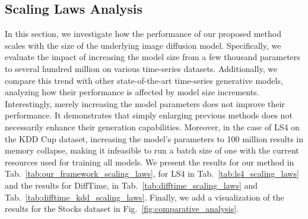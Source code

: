 \documentclass{article}
\begin{document}
\subsection{Scaling Laws Analysis}
In this section, we investigate how the performance of our proposed method scales with the size of the underlying image diffusion model. Specifically, we evaluate the impact of increasing the model size from a few thousand parameters to several hundred million on various time-series datasets. Additionally, we compare this trend with other state-of-the-art time-series generative models, analyzing how their performance is affected by model size increments. Interestingly, merely increasing the model parameters does not improve their performance. It demonstrates that simply enlarging previous methods does not necessarily enhance their generation capabilities. Moreover, in the case of LS4 on the KDD Cup dataset, increasing the model's parameters to 100 million results in memory collapse, making it infeasible to run a batch size of one with the current resources used for training all models. We present the results for our method in Tab.~\ref{tab:our_framework_scaling_laws}, for LS4 in Tab.~\ref{tab:ls4_scaling_laws} and the results for DiffTime, in Tab.~\ref{tab:difftime_scaling_laws} and Tab.~\ref{tab:difftime_kdd_scaling_laws}. Finally, we add a visualization of the results for the Stocks dataset in Fig.~\ref{fig:comparative_analysis}.

\clearpage
\end{document}
